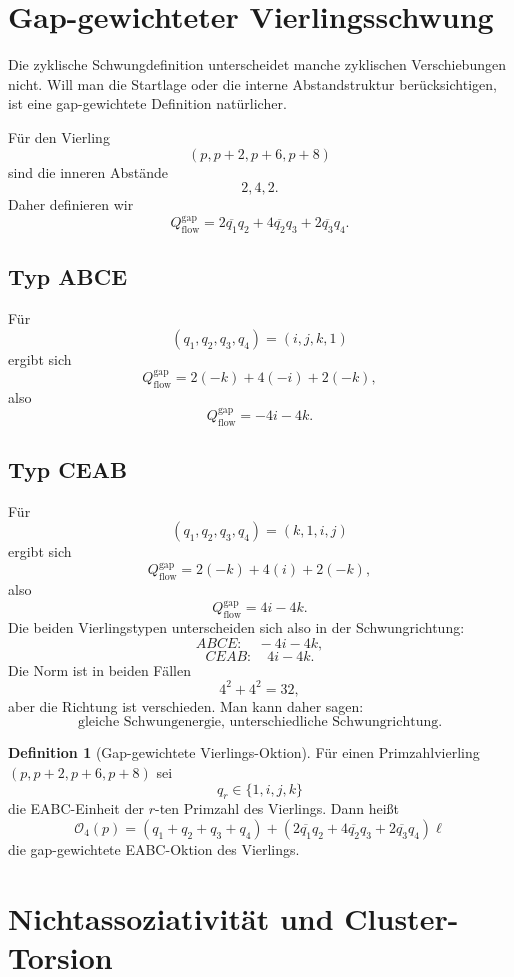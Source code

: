 \documentclass[11pt,a4paper]{article}
\theoremstyle{definition}
\newtheorem{definition}{Definition}[section]
\theoremstyle{plain}
\newcommand{\conj}[1]{\overline{#1}}
\begin{document}
	\section{Gap-gewichteter Vierlingsschwung}
	
	Die zyklische Schwungdefinition unterscheidet manche zyklischen Verschiebungen nicht. Will man die Startlage oder die interne Abstandstruktur berücksichtigen, ist eine gap-gewichtete Definition natürlicher.
	
	Für den Vierling
	\[
	(p,p+2,p+6,p+8)
	\]
	sind die inneren Abstände
	\[
	2,4,2.
	\]
	Daher definieren wir
	\[
	Q_{\mathrm{flow}}^{\mathrm{gap}}
	=
	2\conj{q_1}q_2
	+4\conj{q_2}q_3
	+2\conj{q_3}q_4.
	\]
	
	\subsection{Typ ABCE}
	
	Für
	\[
	(q_1,q_2,q_3,q_4)=(i,j,k,1)
	\]
	ergibt sich
	\[
	Q_{\mathrm{flow}}^{\mathrm{gap}}
	=
	2(-k)+4(-i)+2(-k),
	\]
	also
	\[
	Q_{\mathrm{flow}}^{\mathrm{gap}}=-4i-4k.
	\]
	
	\subsection{Typ CEAB}
	
	Für
	\[
	(q_1,q_2,q_3,q_4)=(k,1,i,j)
	\]
	ergibt sich
	\[
	Q_{\mathrm{flow}}^{\mathrm{gap}}
	=
	2(-k)+4(i)+2(-k),
	\]
	also
	\[
	Q_{\mathrm{flow}}^{\mathrm{gap}}=4i-4k.
	\]
	Die beiden Vierlingstypen unterscheiden sich also in der Schwungrichtung:
	\[
	ABCE:\quad -4i-4k,
	\]
	\[
	CEAB:\quad 4i-4k.
	\]
	Die Norm ist in beiden Fällen
	\[
	4^2+4^2=32,
	\]
	aber die Richtung ist verschieden. Man kann daher sagen:
	\[
	\text{gleiche Schwungenergie, unterschiedliche Schwungrichtung.}
	\]
	
	\begin{definition}[Gap-gewichtete Vierlings-Oktion]
		Für einen Primzahlvierling $(p,p+2,p+6,p+8)$ sei
		\[
		q_r\in\{1,i,j,k\}
		\]
		die EABC-Einheit der $r$-ten Primzahl des Vierlings. Dann heißt
		\[
		\boxed{
			\mathcal O_4(p)
			=
			(q_1+q_2+q_3+q_4)
			+
			\left(
			2\conj{q_1}q_2
			+4\conj{q_2}q_3
			+2\conj{q_3}q_4
			\right)\ell
		}
		\]
		die gap-gewichtete EABC-Oktion des Vierlings.
	\end{definition}
	
	\section{Nichtassoziativität und Cluster-Torsion}
	
\end{document}
